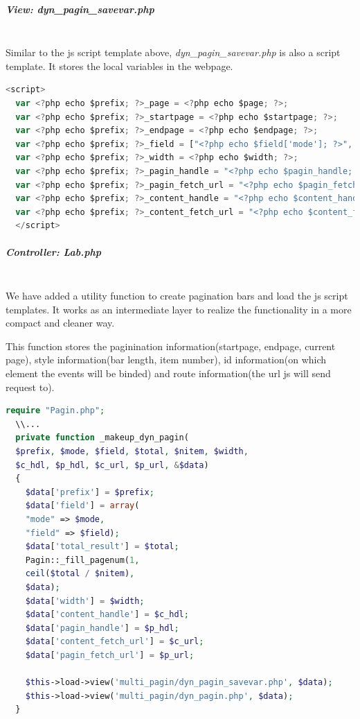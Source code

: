 \documentclass[a4paper, 10pt]{article}
\begin{document}
\subparagraph{View: dyn\_pagin\_savevar.php}\ \\

Similar to the js script template above, \textit{dyn\_pagin\_savevar.php} is also a script template. It stores the local variables in the webpage.
\begin{lstlisting}[language=Javascript]
  <script>
  var <?php echo $prefix; ?>_page = <?php echo $page; ?>;
  var <?php echo $prefix; ?>_startpage = <?php echo $startpage; ?>;
  var <?php echo $prefix; ?>_endpage = <?php echo $endpage; ?>;
  var <?php echo $prefix; ?>_field = ["<?php echo $field['mode']; ?>", "<?php echo $field["field"]; ?>"];
  var <?php echo $prefix; ?>_width = <?php echo $width; ?>;
  var <?php echo $prefix; ?>_pagin_handle = "<?php echo $pagin_handle; ?>";
  var <?php echo $prefix; ?>_pagin_fetch_url = "<?php echo $pagin_fetch_url; ?>";
  var <?php echo $prefix; ?>_content_handle = "<?php echo $content_handle; ?>";
  var <?php echo $prefix; ?>_content_fetch_url = "<?php echo $content_fetch_url; ?>";
  </script>
\end{lstlisting}

\subparagraph{Controller: Lab.php}\ \\
We have added a utility function to create pagination bars and load the js script templates. It works as an intermediate layer to realize the functionality in a more compact and cleaner way.

This function stores the paginination information(startpage, endpage, current page), style information(bar length, item number), id information(on which element the events will be binded) and route information(the url js will send request to).
\begin{lstlisting}[language=php]
  require "Pagin.php";
  \\...
  private function _makeup_dyn_pagin(
  $prefix, $mode, $field, $total, $nitem, $width,
  $c_hdl, $p_hdl, $c_url, $p_url, &$data)
  {
    $data['prefix'] = $prefix;
    $data['field'] = array(
    "mode" => $mode,
    "field" => $field);
    $data['total_result'] = $total;
    Pagin::_fill_pagenum(1,
    ceil($total / $nitem),
    $data);
    $data['width'] = $width;
    $data['content_handle'] = $c_hdl;
    $data['pagin_handle'] = $p_hdl;
    $data['content_fetch_url'] = $c_url;
    $data['pagin_fetch_url'] = $p_url;

    $this->load->view('multi_pagin/dyn_pagin_savevar.php', $data);
    $this->load->view('multi_pagin/dyn_pagin.php', $data);
  }
\end{lstlisting}
\end{document}
